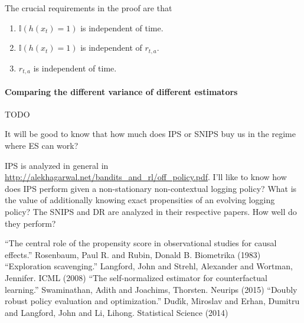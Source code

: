 \documentclass[preview,border={30 30 30 30}]{standalone}
\begin{document}
The crucial requirements in the proof are that
\begin{enumerate}
\item $\mathbb{I}(h(x_t)=1)$ is independent of time.
\item $\mathbb{I}(h(x_t)=1)$ is independent of $r_{t,a}$.
\item $r_{t,a}$ is independent of time.
\end{enumerate}

\paragraph{Comparing the different variance of different estimators}
TODO

It will be good to know that how much does IPS or SNIPS buy us in the regime where ES can work?

IPS is analyzed in general in \url{http://alekhagarwal.net/bandits_and_rl/off_policy.pdf}. I'll like to know how does IPS perform given a non-stationary non-contextual logging policy? What is the value of additionally knowing exact propensities of an evolving logging policy? The SNIPS and DR are analyzed in their respective papers. How well do they perform?

\begin{thebibliography}{widest entry}
 ``The central role of the propensity score in
  observational studies for causal effects.'' Rosenbaum, Paul R. and Rubin, Donald
  B. Biometrika (1983)
 ``Exploration scavenging.'' Langford, John
  and Strehl, Alexander and Wortman, Jennifer. ICML (2008)
 ``The self-normalized estimator for
  counterfactual learning.'' Swaminathan, Adith and Joachims, Thorsten. Neurips (2015)
 ``Doubly robust policy evaluation and optimization.''
  Dud{\'\i}k, Miroslav and Erhan, Dumitru and Langford, John and Li, Lihong. Statistical
  Science (2014)
\end{thebibliography}
\end{document}
